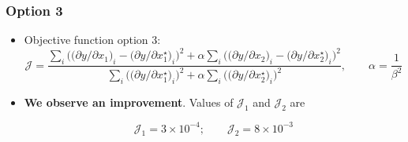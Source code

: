 \begin{frame}
	\frametitle[]{Option 3  \hspace{8cm}}
	\footnotesize
	
	\vspace{0mm}
	
	\begin{itemize}
		\item Objective function option 3:
		\begin{equation*}
			\boxed{\mathcal{J}  =  \frac{\sum_i \Bigg(\Big(\partial y/\partial x_1\Big)_i-\Big(\partial y/\partial x_1^{\star}\Big)_i\Bigg)^2 + \alpha\sum_i \Bigg(\Big(\partial y/\partial x_2\Big)_i-\Big(\partial y/\partial x_2^{\star}\Big)_i\Bigg)^2}{\sum_i\Bigg(\Big(\partial y/\partial x_1^{\star}\Big)_i\Bigg)^2 + \alpha\sum_i\Bigg(\Big(\partial y/\partial x_2^{\star}\Big)_i\Bigg)^2}, \qquad \alpha = \frac{1}{\beta^2}}
		\end{equation*}
		
		
		\begin{center}
			
		\end{center}				
		
		\item \textcolor[rgb]{1.0,0.0,0.0}{\textbf{We observe an improvement}}. Values of $\mathcal{J}_1$	and $\mathcal{J}_2$ are
		
		\begin{equation*}
			\mathcal{J}_1  =  3\times 10^{-4};\qquad \mathcal{J}_2=8\times 10^{-3}
		\end{equation*}
		
	\end{itemize}		
	
	
\end{frame}



